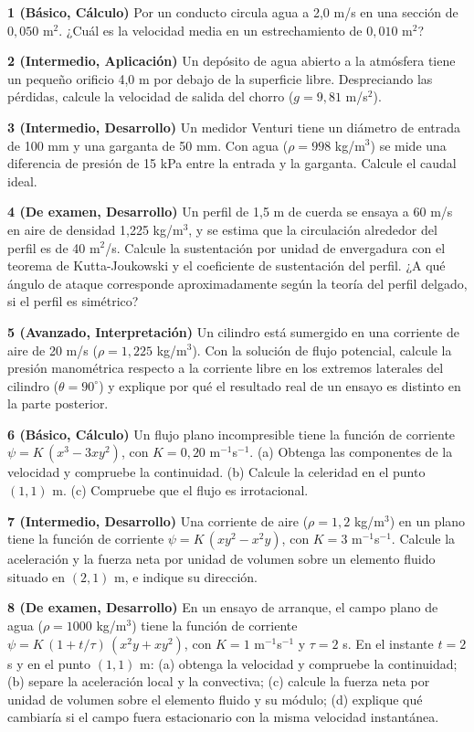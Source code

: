 \documentclass[10pt,openany]{book}
\begin{document}
\begin{tcolorbox}[title={Ejercicios propuestos}, studiumworked, breakable]

\noindent\textbf{1 (Básico, Cálculo)}
Por un conducto circula agua a 2,0 m/s en una sección de \(0{,}050\) m\(^2\). ¿Cuál es la velocidad media en un estrechamiento de \(0{,}010\) m\(^2\)?

\noindent\textbf{2 (Intermedio, Aplicación)}
Un depósito de agua abierto a la atmósfera tiene un pequeño orificio 4,0 m por debajo de la superficie libre. Despreciando las pérdidas, calcule la velocidad de salida del chorro (\(g = 9{,}81\) m/s\(^2\)).

\noindent\textbf{3 (Intermedio, Desarrollo)}
Un medidor Venturi tiene un diámetro de entrada de 100 mm y una garganta de 50 mm. Con agua (\(\rho = 998\) kg/m\(^3\)) se mide una diferencia de presión de 15 kPa entre la entrada y la garganta. Calcule el caudal ideal.

\noindent\textbf{4 (De examen, Desarrollo)}
Un perfil de 1,5 m de cuerda se ensaya a 60 m/s en aire de densidad 1,225 kg/m\(^3\), y se estima que la circulación alrededor del perfil es de 40 m\(^2\)/s. Calcule la sustentación por unidad de envergadura con el teorema de Kutta-Joukowski y el coeficiente de sustentación del perfil. ¿A qué ángulo de ataque corresponde aproximadamente según la teoría del perfil delgado, si el perfil es simétrico?

\noindent\textbf{5 (Avanzado, Interpretación)}
Un cilindro está sumergido en una corriente de aire de 20 m/s (\(\rho = 1{,}225\) kg/m\(^3\)). Con la solución de flujo potencial, calcule la presión manométrica respecto a la corriente libre en los extremos laterales del cilindro (\(\theta = 90^\circ\)) y explique por qué el resultado real de un ensayo es distinto en la parte posterior.

\noindent\textbf{6 (Básico, Cálculo)}
Un flujo plano incompresible tiene la función de corriente \(\psi = K\,(x^{3} - 3xy^{2})\), con \(K = 0{,}20\) m\(^{-1}\)s\(^{-1}\). (a) Obtenga las componentes de la velocidad y compruebe la continuidad. (b) Calcule la celeridad en el punto \((1, 1)\) m. (c) Compruebe que el flujo es irrotacional.

\noindent\textbf{7 (Intermedio, Desarrollo)}
Una corriente de aire (\(\rho = 1{,}2\) kg/m\(^3\)) en un plano tiene la función de corriente \(\psi = K\,(xy^{2} - x^{2}y)\), con \(K = 3\) m\(^{-1}\)s\(^{-1}\). Calcule la aceleración y la fuerza neta por unidad de volumen sobre un elemento fluido situado en \((2, 1)\) m, e indique su dirección.

\noindent\textbf{8 (De examen, Desarrollo)}
En un ensayo de arranque, el campo plano de agua (\(\rho = 1000\) kg/m\(^3\)) tiene la función de corriente \(\psi = K\,(1 + t/\tau)\,(x^{2}y + xy^{2})\), con \(K = 1\) m\(^{-1}\)s\(^{-1}\) y \(\tau = 2\) s. En el instante \(t = 2\) s y en el punto \((1, 1)\) m: (a) obtenga la velocidad y compruebe la continuidad; (b) separe la aceleración local y la convectiva; (c) calcule la fuerza neta por unidad de volumen sobre el elemento fluido y su módulo; (d) explique qué cambiaría si el campo fuera estacionario con la misma velocidad instantánea.
\end{tcolorbox}
\end{document}
